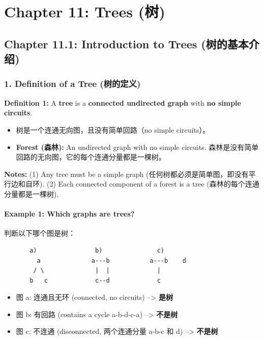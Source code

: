 \documentclass[10pt,a4paper,openany]{ctexbook}
\theoremstyle{definition}
\theoremstyle{remark}
\begin{document}
\chapter{Chapter 11: Trees (树)}

\section{Chapter 11.1: Introduction to Trees (树的基本介绍)}

\vspace{-2pt}

\subsection{1. Definition of a Tree (树的定义)}

\textbf{Definition 1:} A \textbf{tree} is a \textbf{connected undirected graph} with \textbf{no simple circuits}.
\begin{itemize}
\item 树是一个连通无向图，且没有简单回路（no simple circuits）。
\item \textbf{Forest (森林):} An undirected graph with no simple circuits. 森林是没有简单回路的无向图，它的每个连通分量都是一棵树。

\end{itemize}

\textbf{Notes:}
(1) Any tree must be a simple graph (任何树都必须是简单图，即没有平行边和自环).
(2) Each connected component of a forest is a tree (森林的每个连通分量都是一棵树).
\vspace{-2pt}

\subsubsection{Example 1: Which graphs are trees?}

判断以下哪个图是树：
{\footnotesize\begin{verbatim}
       a)                b)               c)
         a              a---b           a---b    d
        / \              |  |             |
       b   c             c--d             c
\end{verbatim}}

\begin{itemize}
\item 图 a: 连通且无环 (connected, no circuits) --> \textbf{是树}
\item 图 b: 有回路 (contains a cycle a-b-d-c-a) --> \textbf{不是树}
\item 图 c: 不连通 (disconnected, 两个连通分量 a-b-c 和 d) --> \textbf{不是树}

\end{itemize}
\end{document}
